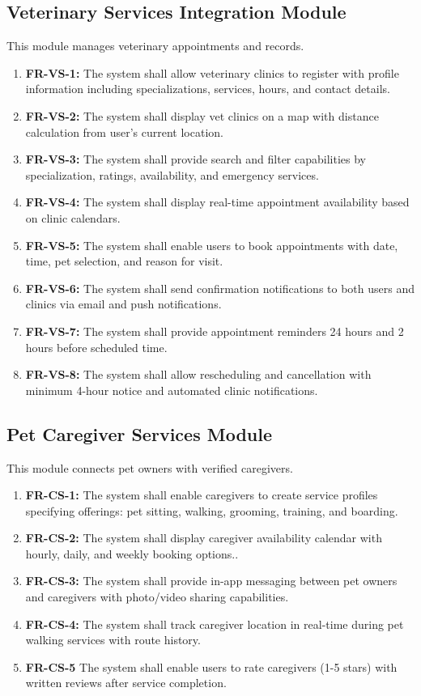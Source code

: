 \subsection{Veterinary Services Integration Module}
This module manages veterinary appointments and records.

\begin{enumerate}
    \item \textbf{FR-VS-1:} The system shall allow veterinary clinics to register with profile information including specializations, services, hours, and contact details.
    \item \textbf{FR-VS-2:} The system shall display vet clinics on a map with distance calculation from user's current location.
    \item \textbf{FR-VS-3:} The system shall provide search and filter capabilities by specialization, ratings, availability, and emergency services.
    \item \textbf{FR-VS-4:} The system shall display real-time appointment availability based on clinic calendars.
    \item \textbf{FR-VS-5:} The system shall enable users to book appointments with date, time, pet selection, and reason for visit.
    \item \textbf{FR-VS-6:} The system shall send confirmation notifications to both users and clinics via email and push notifications.
    \item \textbf{FR-VS-7:} The system shall provide appointment reminders 24 hours and 2 hours before scheduled time.
    \item \textbf{FR-VS-8:} The system shall allow rescheduling and cancellation with minimum 4-hour notice and automated clinic notifications.
\end{enumerate}

\subsection{Pet Caregiver Services Module}
This module connects pet owners with verified caregivers.

\begin{enumerate}
    \item \textbf{FR-CS-1:} The system shall enable caregivers to create service profiles specifying offerings: pet sitting, walking, grooming, training, and boarding.
    \item \textbf{FR-CS-2:} The system shall display caregiver availability calendar with hourly, daily, and weekly booking options..
    \item \textbf{FR-CS-3:} The system shall provide in-app messaging between pet owners and caregivers with photo/video sharing capabilities.
    \item \textbf{FR-CS-4:} The system shall track caregiver location in real-time during pet walking services with route history.
    \item \textbf{FR-CS-5} The system shall enable users to rate caregivers (1-5 stars) with written reviews after service completion.
\end{enumerate}

